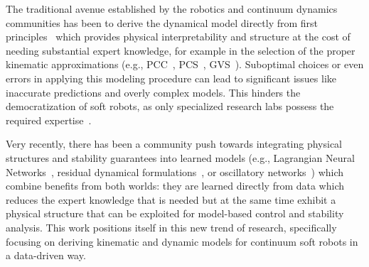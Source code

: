 The traditional avenue established by the robotics and continuum dynamics communities has been to derive the dynamical model directly from first principles~\cite{renda2018discrete, boyer2020dynamics, della2023model, armanini2023soft} %
which provides physical interpretability and structure at the cost of needing substantial expert knowledge, for example in the selection of the proper kinematic approximations (e.g., \gls{PCC}~\cite{webster2010design}, \gls{PCS}~\cite{renda2018discrete}, \gls{GVS}~\cite{boyer2020dynamics}). %
%
Suboptimal choices or even errors in applying this modeling procedure can lead to significant issues like inaccurate predictions and overly complex models. This hinders the democratization of soft robots, as only specialized research labs possess the required expertise~\cite{aracri2024soft}.

Very recently, there has been a community push towards integrating physical structures and stability guarantees into learned models (e.g., Lagrangian Neural Networks~\cite{liu2024physics}, residual dynamical formulations~\cite{bruder2024koopman, gao2024sim}, or oscillatory networks~\cite{stolzle2024input}) which combine benefits from both worlds: they are learned directly from data which reduces the expert knowledge that is needed but at the same time exhibit a physical structure that can be exploited for model-based control and stability analysis.
This work positions itself in this new trend of research, specifically focusing on deriving kinematic and dynamic models for continuum soft robots in a data-driven way.
%
%


